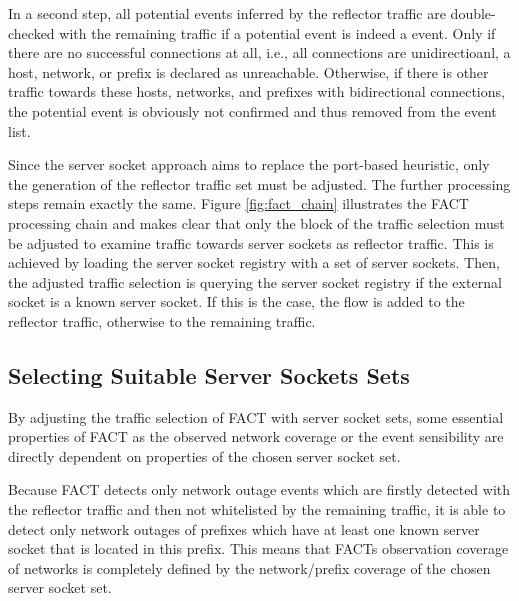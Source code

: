In a second step, all potential events inferred by the reflector traffic are  double-checked with the remaining traffic if a potential event is indeed a  event. 
Only if there are no successful connections at all, i.e., all connections are unidirectioanl, a host, network, or prefix is declared as unreachable. 
Otherwise, if there is other traffic towards these hosts, networks, and prefixes with bidirectional connections, the potential event is obviously not confirmed and thus removed from the event list. 

Since the \gls{server socket} approach aims to replace the port-based heuristic,  only the generation of the reflector traffic set must be adjusted. 
The further processing steps remain exactly the same. 
Figure \ref{fig:fact_chain} illustrates the \gls{FACT} processing chain and makes clear that only the block of the traffic selection must be adjusted to examine traffic towards \glspl{server socket} as reflector traffic. 
This is achieved by loading the \gls{server socket} registry with a set of \glspl{server socket}. 
Then, the adjusted traffic selection is querying the server socket registry if the external socket is a known \gls{server socket}. 
If this is the case, the flow is added to the reflector traffic, otherwise to the remaining traffic. 

\subsection{Selecting Suitable Server Sockets Sets\label{section:ses_selection}}
By adjusting the traffic selection of \gls{FACT} with \gls{server socket} sets,  some essential properties of \gls{FACT} as the observed network coverage or the event sensibility are directly dependent on properties of the chosen \gls{server socket} set. 

Because \gls{FACT} detects only network outage events which are firstly detected  with the reflector traffic and then not whitelisted by the remaining traffic, it  is able to detect only network outages of prefixes which have at least one known  server socket that is located in this prefix. This means that FACTs observation  coverage of networks is completely defined by the network/prefix coverage of the  chosen \gls{server socket} set. 

